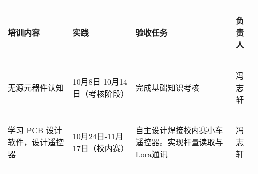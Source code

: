
\begin{longtable}{ p{1.5cm} | p{3cm} | p{6cm} | p{4.3cm} |}

    \hline

    \endfoot
    
    \rowcolor{tabhdcolor}

        \begin{center}
            培训内容
        \end{center} &
        \begin{center}
            实践
        \end{center} &
        \begin{center}
            验收任务
        \end{center} &
        \begin{center}
            负责人
        \end{center}\\

    \hline

    \endhead

        \begin{center}
            无源元器件认知
        \end{center} &
        \begin{center}
            10月8日-10月14日（考核阶段）
        \end{center} &
        \begin{center}
            完成基础知识考核
        \end{center} &
        \begin{center}
            冯志轩
        \end{center}\\
        
    \hline
        \begin{center}
            学习 PCB 设计软件，设计遥控器
        \end{center}&
        \begin{center}
            10月24日-11月17日（校内赛）
        \end{center}&
        \begin{center}
            自主设计焊接校内赛小车遥控器。实现杆量读取与Lora通讯
        \end{center}&
        \begin{center}
            冯志轩
        \end{center}\\
        

\end{longtable}
